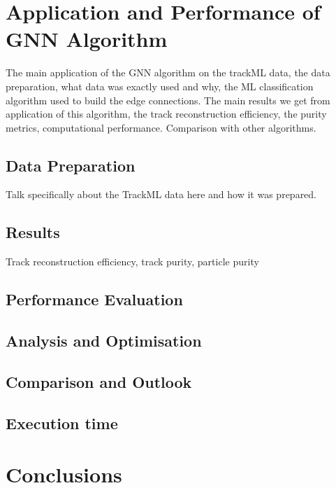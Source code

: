 
\section{Application and Performance of GNN Algorithm}
\label{chapter-gnn}

The main application of the GNN algorithm on the trackML data, the data preparation, what data was exactly used and why, the ML classification algorithm used to build the edge connections. The main results we get from application of this algorithm, the track reconstruction efficiency, the purity metrics, computational performance. Comparison with other algorithms.

\subsection{Data Preparation}

Talk specifically about the TrackML data here and how it was prepared.


\subsection{Results}
Track reconstruction efficiency, track purity, particle purity
\subsection{Performance Evaluation}
\subsection{Analysis and Optimisation}
\subsection{Comparison and Outlook}
\subsection{Execution time}

\section{Conclusions}
